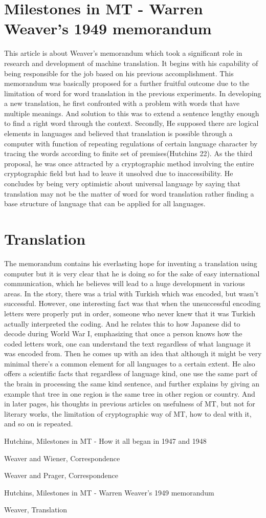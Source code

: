 \documentclass{report}
\begin{document}
\section{Milestones in MT - Warren Weaver's 1949 memorandum}
This article is about Weaver’s memorandum which took a significant role in research and development of machine translation. It begins with his capability of being responsible for the job based on his previous accomplishment. This memorandum was basically proposed for a further fruitful outcome due to the limitation of word for word translation in the previous experiments. In developing a new translation, he first confronted with a problem with words that have multiple meanings. And solution to this was to extend a sentence lengthy enough to find a right word through the context. Secondly, He supposed there are logical elements in languages and believed that translation is possible through a computer with function of repeating regulations of certain language character by tracing the words according to finite set of premises(Hutchins 22). As the third proposal, he was once attracted by a cryptographic method involving the entire cryptographic field but had to leave it unsolved due to inaccessibility. He concludes by being very optimistic about universal language by saying that translation may not be the matter of word for word translation rather finding a base structure of language that can be applied for all languages.

\section{Translation}
The memorandum contains his everlasting hope for inventing a translation using computer but it is very clear that he is doing so for the sake of easy international communication, which he believes will lead to a huge development in various areas. In the story, there was a trial with Turkish which was encoded, but wasn’t successful. However, one interesting fact was that when the unsuccessful encoding letters were properly put in order, someone who never knew that it was Turkish actually interpreted the coding. And he relates this to how Japanese did to decode during World War I, emphasizing that once a person knows how the coded letters work, one can understand the text regardless of what language it was encoded from. Then he comes up with an idea that although it might be very minimal there’s a common element for all languages to a certain extent. He also offers a scientific facts that regardless of language kind, one use the same part of the brain in processing the same kind sentence, and further explains by giving an example that tree in one region is the same tree in other region or country. And in later pages, his thoughts in previous articles on usefulness of MT, but not for literary works, the limitation of cryptographic way of MT, how to deal with it, and so on is repeated.



Hutchins, Milestones in MT - How it all began in 1947 and 1948

Weaver and Wiener, Correspondence

Weaver and Prager, Correspondence

Hutchins, Milestones in MT - Warren Weaver's 1949 memorandum

Weaver, Translation
\end{document}
